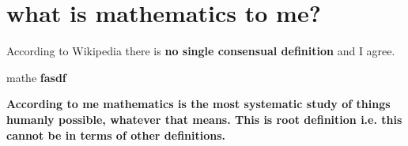 \documentclass[./main.tex]{subfiles}
\begin{document}
\section{what is mathematics to me?}

According to Wikipedia there is \textbf{no single consensual definition} and I agree.

\begin{definition}
  \label{def:mathe}

  mathe \textbf{fasdf}

\end{definition}


\begin{definition}
  \label{def:math}

  \textbf{According to me mathematics is the most systematic study of things humanly possible, whatever that means. This is root definition i.e. this cannot be in terms of other definitions.}

\end{definition}

\pagebreak
\end{document}
